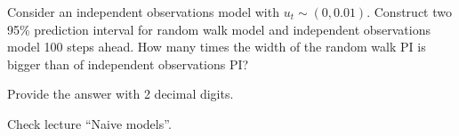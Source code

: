 
\begin{question}
Consider an independent observations model with \(u_t \sim (0, 0.01)\). Construct two 95\% prediction interval for random walk model and independent observations model 100 steps ahead. How many times the width of the random walk PI is bigger than of independent observations PI?

Provide the answer with 2 decimal digits.
\end{question}

\begin{solution}
Check lecture ``Naive models''.
\end{solution}

